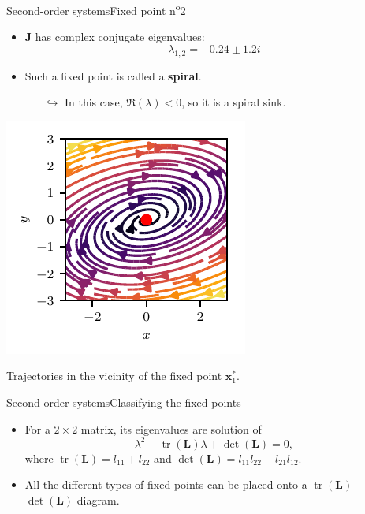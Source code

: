 \documentclass[usenames,dvipsnames,svgnames,10pt,aspectratio=169]{beamer}
\DeclareMathOperator{\trace}{tr}
\begin{document}
\begin{frame}[t, c]{Second-order systems}{Fixed point n\textsuperscript{o}2}
		\begin{minipage}{.48\textwidth}
			\begin{itemize}
				\item ${\bm J}$ has complex conjugate eigenvalues:
				$$\lambda_{1, 2} = -0.24 \pm 1.2 i$$

				\item Such a fixed point is called a \alert{\textbf{spiral}}.
				\begin{itemize}
					\item[$\hookrightarrow$] In this case, $\Re(\lambda)<0$, so it is a spiral sink.
				\end{itemize}
			\end{itemize}
		\end{minipage}%
		\hfill
		\begin{minipage}{.48\textwidth}
			\centering
			\includegraphics[width=.75\textwidth]{fixed_points_2_bis}

			{\small Trajectories in the vicinity of the fixed point ${\bm x}^*_1$.}
		\end{minipage}

		\vspace{1cm}
\end{frame}

\begin{frame}[t, c]{Second-order systems}{Classifying the fixed points}
	\begin{itemize}
		\item For a $2 \times 2$ matrix, its eigenvalues are solution of
		$$\lambda^2 - \trace({\bm L}) \lambda + \det({\bm L}) = 0,$$
		where $\trace({\bm L}) = l_{11} + l_{22}$ and $\det({\bm L}) = l_{11}l_{22} - l_{21}l_{12}$.

		\bigskip

		\item All the different types of fixed points can be placed onto a $\trace({\bm L})$--$\det({\bm L})$ diagram.
	\end{itemize}

	\vspace{1cm}
\end{frame}
\end{document}
